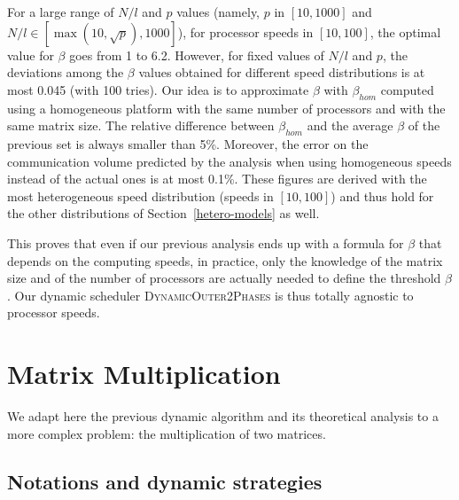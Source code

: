 \documentclass[a4paper,10pt]{article}
\newcommand{\stupidthreshold}{\textsc{Dynamic\-Outer\-2Phases}\xspace}
\begin{document}
For a large range of $N/l$ and $p$ values (namely, $p$ in $[10,1000]$
and $N/l \in [\max(10,\sqrt{p}), 1000]$), for processor speeds in
$[10,100]$, the optimal value for $\beta$ goes from 1 to 6.2. However,
for fixed values of $N/l$ and $p$, the deviations among the $\beta$
values obtained for different speed distributions is at most 0.045
(with 100 tries).  Our idea is to approximate $\beta$ with
$\beta_{\mathit{hom}}$ computed using a homogeneous platform with the
same number of processors and with the same matrix size. The relative
difference between $\beta_{\mathit{hom}}$ and the average $\beta$ of
the previous set is always smaller than 5\%. Moreover, the error on
the communication volume predicted by the analysis when using
homogeneous speeds instead of the actual ones is at most 0.1\%. These
figures are derived with the most heterogeneous speed distribution
(speeds in $[10,100]$) and thus hold for the other distributions of
Section~\ref{hetero-models} as well.

This proves that even if our previous analysis ends up with a formula
for $\beta$ that depends on the computing speeds, in practice, only
the knowledge of the matrix size and of the number of processors are
actually needed to define the threshold $\beta$. Our dynamic scheduler
\stupidthreshold is thus totally agnostic to processor speeds.


\section{Matrix Multiplication}
\label{matrix_mult}

We adapt here the previous dynamic algorithm and its theoretical
analysis to a more complex problem: the multiplication of two
matrices.



\subsection{Notations and dynamic strategies}
\end{document}
